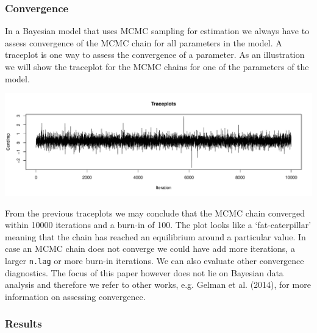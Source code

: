 \documentclass[11pt,]{article}
\begin{document}
\subsubsection{Convergence}

In a Bayesian model that uses MCMC sampling for estimation we always
have to assess convergence of the MCMC chain for all parameters in the
model. A traceplot is one way to assess the convergence of a parameter.
As an illustration we will show the traceplot for the MCMC chains for
one of the parameters of the model.

\includegraphics{ManuscriptMarkdownV2_files/figure-latex/unnamed-chunk-6-1.pdf}

From the previous traceplots we may conclude that the MCMC chain
converged within 10000 iterations and a burn-in of 100. The plot looks
like a `fat-caterpillar' meaning that the chain has reached an
equilibrium around a particular value. In case an MCMC chain does not
converge we could have add more iterations, a larger \verb|n.lag| or
more burn-in iterations. We can also evaluate other convergence
diagnostics. The focus of this paper however does not lie on Bayesian
data analysis and therefore we refer to other works, e.g. Gelman et al.
(2014), for more information on assessing convergence.

\subsubsection{Results}\label{ResMR}
\end{document}
